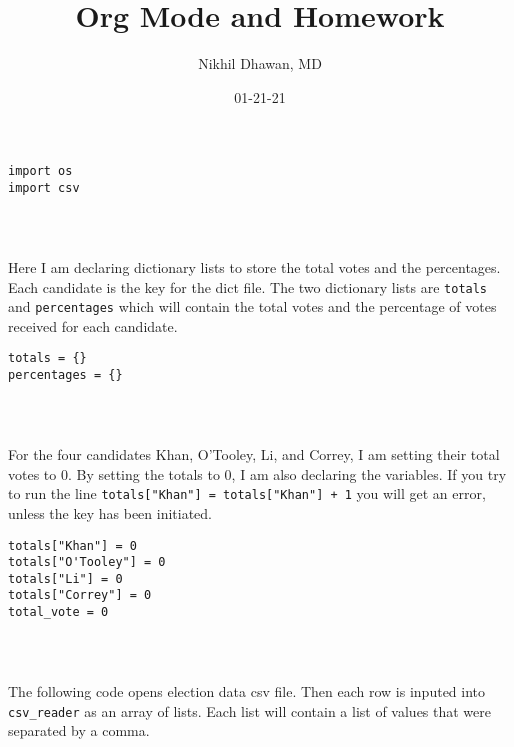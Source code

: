 \documentclass[11pt]{article}
\author{Nikhil Dhawan, MD}
\date{01-21-21}
\title{Org Mode and Homework}
\begin{document}
\maketitle
\tableofcontents

\begin{verbatim}
import os
import csv
\end{verbatim}

\begin{verbatim}



\end{verbatim}


Here I am declaring dictionary lists to store the total votes and the percentages. Each candidate is the key for the dict file. The two dictionary lists are \texttt{totals} and \texttt{percentages} which will contain the total votes and the percentage of votes received for each candidate. 

\begin{verbatim}
totals = {}
percentages = {}
\end{verbatim}

\begin{verbatim}



\end{verbatim}


For the four candidates Khan, O'Tooley, Li, and Correy, I am setting their total votes to 0. By setting the totals to 0, I am also declaring the variables. If you try to run the line \texttt{\texttt{totals["Khan"] = totals["Khan"] + 1}} you will get an error, unless the key has been initiated. 

\begin{verbatim}
totals["Khan"] = 0
totals["O'Tooley"] = 0
totals["Li"] = 0
totals["Correy"] = 0
total_vote = 0

\end{verbatim}

\begin{verbatim}



\end{verbatim}


The following code opens election data csv file. Then each row is inputed into \texttt{csv\_reader} as an array of lists. Each list will contain a list of values that were separated by a comma. 
\end{document}
